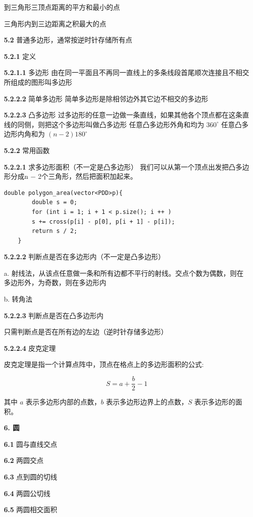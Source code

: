 到三角形三顶点距离的平方和最小的点

三角形内到三边距离之积最大的点

\textbf{5.2} 普通多边形，通常按逆时针存储所有点

\textbf{5.2.1} 定义

\textbf{5.2.1.1} 多边形
由在同一平面且不再同一直线上的多条线段首尾顺次连接且不相交所组成的图形叫多边形

\textbf{5.2.2.2} 简单多边形
简单多边形是除相邻边外其它边不相交的多边形

\textbf{5.2.2.3} 凸多边形
过多边形的任意一边做一条直线，如果其他各个顶点都在这条直线的同侧，则把这个多边形叫做凸多边形
任意凸多边形外角和均为 $360^{\circ}$
任意凸多边形内角和为 $(n−2)180^{\circ}$

\textbf{5.2.2} 常用函数

\textbf{5.2.2.1} 求多边形面积（不一定是凸多边形）
我们可以从第一个顶点出发把凸多边形分成n − 2个三角形，然后把面积加起来。

\begin{lstlisting}[style=C++]
	double polygon_area(vector<PDD>p){
		double s = 0;
		for (int i = 1; i + 1 < p.size(); i ++ )
		s += cross(p[i] - p[0], p[i + 1] - p[i]);
		return s / 2;
	}
\end{lstlisting}

\textbf{5.2.2.2} 判断点是否在多边形内（不一定是凸多边形）

a. 射线法，从该点任意做一条和所有边都不平行的射线。交点个数为偶数，则在多边形外，为奇数，则在多边形内

b. 转角法

\textbf{5.2.2.3} 判断点是否在凸多边形内

只需判断点是否在所有边的左边（逆时针存储多边形）

\textbf{5.2.2.4} 皮克定理

皮克定理是指一个计算点阵中，顶点在格点上的多边形面积的公式:

$$
S = a + \frac{b}{2} - 1
$$

其中 $a$ 表示多边形内部的点数，$b$ 表示多边形边界上的点数，$S$ 表示多边形的面积。

\textbf{6. 圆}

\textbf{6.1} 圆与直线交点

\textbf{6.2} 两圆交点

\textbf{6.3} 点到圆的切线

\textbf{6.4} 两圆公切线

\textbf{6.5} 两圆相交面积